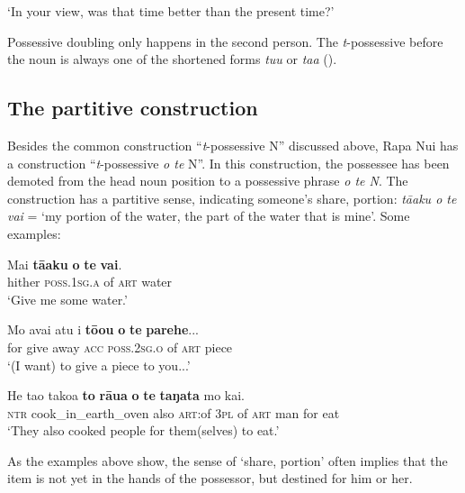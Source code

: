 \glt
‘In your view, was that time better than the present time?’ \textstyleExampleref{[R380.106]} 
\z

Possessive doubling only happens in the second person. The \textit{t}{}-possessive before the noun is always one of the shortened forms \textit{tu{\ꞌ}u} or \textit{ta{\ꞌ}a} ().

\subsection{The partitive construction}\label{sec:6.2.2}
Besides the common construction “\textit{t}{}-possessive N” discussed above, Rapa Nui has a construction “\textit{t}{}-possessive \textit{o te} N”. In this construction, the possessee has been demoted from the head noun position to a possessive phrase \textit{o te N}. The construction has a partitive sense, indicating someone’s share, portion: \textit{\mbox{tā{\ꞌ}aku} o te vai} = ‘my portion of the water, the part of the water that is mine’. Some examples: 

\ea\label{ex:6.16}
\gll Mai \textbf{tā{\ꞌ}aku} \textbf{o} \textbf{te} \textbf{vai}. \\
hither \textsc{poss.1sg.a} of \textsc{art} water \\

\glt 
‘Give me some water.’ \textstyleExampleref{[Notes]}
\z

\ea\label{ex:6.17}
\gll Mo {\ꞌ}avai atu i \textbf{tō{\ꞌ}ou} \textbf{o} \textbf{te} \textbf{parehe}... \\
for give away \textsc{acc} \textsc{poss.2sg.o} of \textsc{art} piece \\

\glt 
‘(I want) to give a piece to you...’ \textstyleExampleref{[R219.021]} 
\z

\ea\label{ex:6.18}
\gll He ta{\ꞌ}o tako{\ꞌ}a \textbf{to} \textbf{rāua} \textbf{o} \textbf{te} \textbf{taŋata} mo kai.\\
\textsc{ntr} cook\_in\_earth\_oven also \textsc{art}:of \textsc{3pl} of \textsc{art} man for eat\\

\glt
‘They also cooked people for them(selves) to eat.’ \textstyleExampleref{[Mtx-3-01.282]}
\z

As the examples above show, the sense of ‘share, portion’ often implies that the item is not yet in the hands of the possessor, but destined for him or her. 

